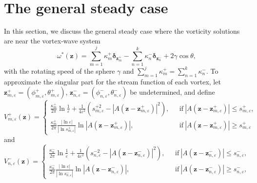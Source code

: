 \documentclass[12pt,reqno]{amsart}
\numberwithin{equation}{section}
\theoremstyle{definition}
\theoremstyle{remark}
\begin{document}
	\section{The general steady case}\label{sec3}
	
	In this section, we discuss the general steady case where the vorticity solutions are near the vortex-wave system
	\begin{equation*}
		\omega^*(\boldsymbol z)=\sum\limits_{m=1}^{j}\kappa_m^+\boldsymbol \delta_{\boldsymbol z_m^+}-\sum\limits_{n=1}^{k}\kappa_n^-\boldsymbol \delta_{\boldsymbol z_n^-}+2\gamma\cos\theta,
	\end{equation*}
	with the rotating speed of the sphere $\gamma$ and $\sum\limits_{m=1}^{j}\kappa_m^+=\sum\limits_{n=1}^{k}\kappa_n^-$.
	To approximate the singular part for the stream function of each vortex, 
	let $\boldsymbol z^+_{m,\varepsilon}=(\phi^+_{m,\varepsilon}, \theta^+_{m,\varepsilon})$, $\boldsymbol z^-_{n,\varepsilon}=(\phi^-_{n,\varepsilon}, \theta^-_{n,\varepsilon})$ be undetermined, and define  
	\begin{equation*}
		V^+_{m,\varepsilon}(\boldsymbol z)=\left\{
		\begin{array}{lll}
			\frac{\kappa_m^+}{2\pi}\ln\frac{1}{\varepsilon}+\frac{1}{4\varepsilon^2}(s_{m,\varepsilon}^{+2}-|A(\boldsymbol z-\boldsymbol z^+_{m,\varepsilon})|^2), \ \ \ &\mathrm{if} \ |A(\boldsymbol z-\boldsymbol z^+_{m,\varepsilon})|\le s_{m,\varepsilon}^+,\\
			\frac{\kappa_m^+}{2\pi}\frac{|\ln\varepsilon|}{|\ln s_{m,\varepsilon}^+|}\ln|A(\boldsymbol z-\boldsymbol z^+_{m,\varepsilon})|,&\mathrm{if} \ |A(\boldsymbol z-\boldsymbol z^+_{m,\varepsilon})|\ge s_{m,\varepsilon}^+
		\end{array}
		\right.
	\end{equation*}
	and
	\begin{equation*}
		V^-_{n,\varepsilon}(\boldsymbol z)=\left\{
		\begin{array}{lll}
			\frac{\kappa_n^-}{2\pi}\ln\frac{1}{\varepsilon}+\frac{1}{4\varepsilon^2}(s_{n,\varepsilon}^{-2}-|A(\boldsymbol z-\boldsymbol z^-_{n,\varepsilon})|^2), \ \ \ &\mathrm{if} \ |A(\boldsymbol z-\boldsymbol z^-_{n,\varepsilon})|\le s_{n,\varepsilon}^-,\\
			\frac{\kappa_n^-}{2\pi}\frac{|\ln\varepsilon|}{|\ln s_{n,\varepsilon}^-|}\ln|A(\boldsymbol z-\boldsymbol z^-_{n,\varepsilon})|,&\mathrm{if} \ |A(\boldsymbol z-\boldsymbol z^-_{n,\varepsilon})|\ge s_{n,\varepsilon}^-,
		\end{array}
		\right.
	\end{equation*}
\end{document}
